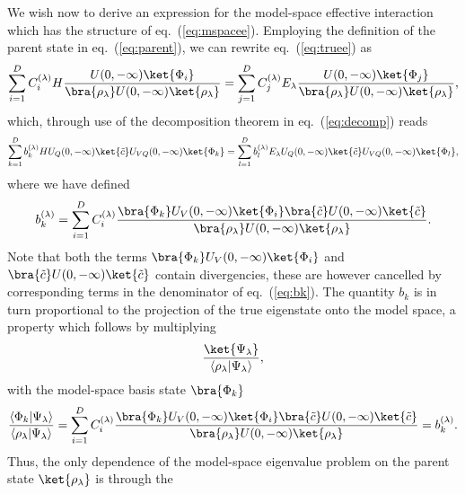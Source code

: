 We wish now to derive an expression for the model-space effective 
interaction which has the structure of eq.\ (\ref{eq:mspacee}). 
Employing the definition of the parent state in eq.\ (\ref{eq:parent}),
we can rewrite eq.\ (\ref{eq:truee}) as
\begin{equation}
{\displaystyle \sum_{i=1}^{D}C_i^{(\lambda )}
H\frac{U(0,-\infty )\ket{\Phi_i} }
{ \bra{\rho_{\lambda}} U(0,-\infty )\ket{\rho_{\lambda}} }=
\sum_{j=1}^{D}C_j^{(\lambda )}E_{\lambda}\frac{U(0,-\infty )\ket{\Phi_j} }
{ \bra{\rho_{\lambda}} U(0,-\infty )\ket{\rho_{\lambda}} }},
\label{eq:truee1}
\end{equation}
which, through use of the decomposition 
theorem in eq.\ (\ref{eq:decomp}) reads
\begin{equation}
{\displaystyle \sum_{k=1}^{D}b_k^{(\lambda )}
HU_Q(0,-\infty )\ket{\tilde{c}}U_{VQ}(0,-\infty )\ket{\Phi_k}=
\sum_{l=1}^{D}b_l^{(\lambda )}E_{\lambda}
U_Q(0,-\infty )\ket{\tilde{c}}U_{VQ}(0,-\infty )\ket{\Phi_l}},
\label{eq:truee2}
\end{equation}
where we have defined 
\begin{equation}
b_k^{(\lambda )}=
{\displaystyle \sum_{i=1}^{D}C_i^{(\lambda )}
\frac{\bra{\Phi_k}U_V(0,-\infty )\ket{\Phi_i} 
\bra{\tilde{c}}U(0,-\infty )\ket{\tilde{c}}}
{ \bra{\rho_{\lambda}} U(0,-\infty )\ket{\rho_{\lambda}} }}.
\label{eq:bk}
\end{equation}
Note that both the terms $\bra{\Phi_k}U_V(0,-\infty )\ket{\Phi_i} $ and
$\bra{\tilde{c}}U(0,-\infty )\ket{\tilde{c}}$ contain
divergencies, these are however cancelled by corresponding terms in the
denominator of eq.\ (\ref{eq:bk}). The quantity $b_k$ is in turn proportional
to the projection of the true eigenstate onto the model space, a property
which follows by multiplying 
\begin{equation}
\frac{\ket{\Psi_{\lambda}}}
{\left\langle\rho_{\lambda} | \Psi_{\lambda} \right\rangle},
\end{equation}
with the model-space basis state $\bra{\Phi_k}$
\begin{equation}
\frac{\left\langle\Phi_k | \Psi_{\lambda} \right\rangle }
{\left\langle\rho_{\lambda} | \Psi_{\lambda} \right\rangle}=
{\displaystyle \sum_{i=1}^{D}C_i^{(\lambda )}
\frac{\bra{\Phi_k}U_V(0,-\infty )\ket{\Phi_i} 
\bra{\tilde{c}}U(0,-\infty )\ket{\tilde{c}}}
{ \bra{\rho_{\lambda}} U(0,-\infty )\ket{\rho_{\lambda}} }}=
b_k^{(\lambda )}.
\label{eq:bk1}
\end{equation}
Thus, the only dependence of the model-space eigenvalue problem
on the parent state $\ket{\rho_{\lambda}}$ is through the
